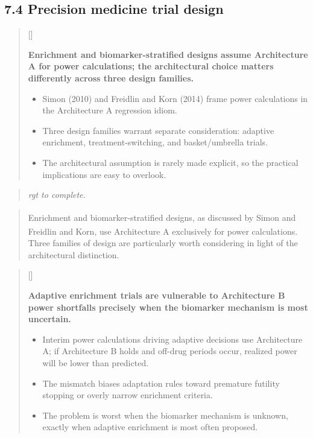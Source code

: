 \documentclass[
  11pt,
]{article}
\newcounter{pgraph}
\newenvironment{bullets}{%
  \stepcounter{pgraph}%
  \begin{quote}\small\sffamily\color[gray]{0.30}%
  {\normalfont\scriptsize\color[gray]{0.58}[\thepgraph]\enspace}}{%
  \end{quote}}
\newenvironment{rgt}{%
  \begin{quote}\small\itshape\color[RGB]{20,60,160}}{%
  \end{quote}}
\newenvironment{orig}{%
  \begin{quote}\normalsize\color[gray]{0.55}}{%
  \end{quote}}
\begin{document}
\subsection{7.4 Precision medicine trial design}

\begin{bullets}

\textbf{Enrichment and biomarker-stratified designs assume
Architecture A for power calculations; the architectural choice
matters differently across three design families.}

\begin{itemize}\setlength{\itemsep}{2pt}\setlength{\parskip}{0pt}
\item Simon (2010) and Freidlin and Korn (2014) frame power
  calculations in the Architecture A regression idiom.
\item Three design families warrant separate consideration:
  adaptive enrichment, treatment-switching, and basket/umbrella
  trials.
\item The architectural assumption is rarely made explicit, so the
  practical implications are easy to overlook.
\end{itemize}

\end{bullets}

\begin{rgt}
rgt to complete.

\end{rgt}

\begin{orig}
Enrichment and biomarker-stratified designs, as discussed by
Simon\textsuperscript{} and Freidlin and
Korn\textsuperscript{}, use Architecture A
exclusively for power calculations. Three families of design are
particularly worth considering in light of the architectural
distinction.

\end{orig}

\begin{bullets}

\textbf{Adaptive enrichment trials are vulnerable to
Architecture B power shortfalls precisely when the biomarker
mechanism is most uncertain.}

\begin{itemize}\setlength{\itemsep}{2pt}\setlength{\parskip}{0pt}
\item Interim power calculations driving adaptive decisions use
  Architecture A; if Architecture B holds and off-drug periods occur,
  realized power will be lower than predicted.
\item The mismatch biases adaptation rules toward premature
  futility stopping or overly narrow enrichment criteria.
\item The problem is worst when the biomarker mechanism is
  unknown, exactly when adaptive enrichment is most often
  proposed.
\end{itemize}

\end{bullets}
\end{document}
